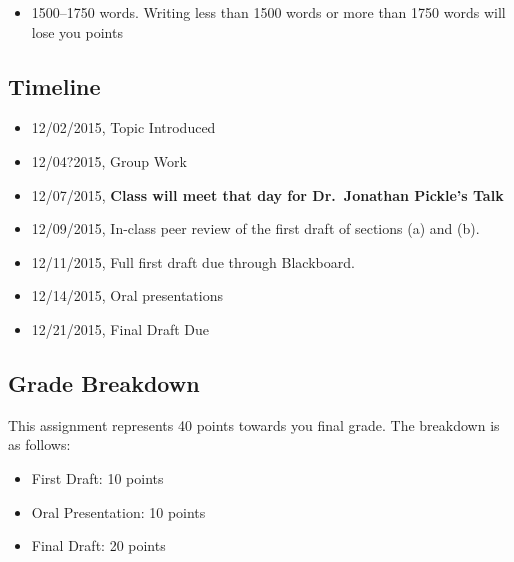\documentclass[]{article}
\providecommand{\tightlist}{%
  \setlength{\itemsep}{0pt}\setlength{\parskip}{0pt}}
\begin{document}
\begin{itemize}
\tightlist
\item
  1500--1750 words. Writing less than 1500 words or more than 1750 words
  will lose you points
\end{itemize}

\subsection{Timeline}\label{timeline}

\begin{itemize}
\tightlist
\item
  12/02/2015, Topic Introduced
\item
  12/04?2015, Group Work
\item
  12/07/2015, \textbf{Class will meet that day for Dr.~Jonathan Pickle's
  Talk}
\item
  12/09/2015, In-class peer review of the first draft of sections (a)
  and (b).
\item
  12/11/2015, Full first draft due through Blackboard.
\item
  12/14/2015, Oral presentations
\item
  12/21/2015, Final Draft Due
\end{itemize}

\subsection{Grade Breakdown}\label{grade-breakdown}

This assignment represents 40 points towards you final grade. The
breakdown is as follows:

\begin{itemize}
\tightlist
\item
  First Draft: 10 points
\item
  Oral Presentation: 10 points
\item
  Final Draft: 20 points
\end{itemize}
\end{document}

